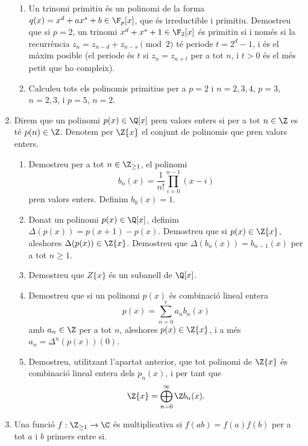 \begin{enumerate}[leftmargin=*]
\begin{enumerate}
\item Un trinomi primitiu és un polinomi de la forma $q(x)=x^d+ax^s+b\in
\F_p[x]$, que és irreductible i primitiu. Demostreu que si $p=2$, un
trinomi $x^d+x^s+1\in \F_2[x]$ és primitiu si i només si la
recurr\`{e}ncia $z_n=z_{n-d}+z_{n-s} \pmod{2}$ té periode $t=2^d-1$, i
és el màxim posible (el periode és $t$ si $z_{n}=z_{n+t}$ per a tot
$n$, i $t>0$ és el més petit que ho compleix).


\item Calculeu tots els polinomis primitius per a $p=2$ i $n=2,3,4$, $p=3$, $n=2,3$, i
$p=5$, $n=2$.

\end{enumerate}

\item Direm que un polinomi $p(x)\in \Q[x]$ pren valors
enters si per a tot $n\in \Z$ es té  $p(n)\in \Z$. Denotem per
$\Z\{x\}$ el conjunt de polinomis que pren valors enters.

\begin{enumerate}
\item Demostreu per a tot $n\in \Z_{\ge 1}$, el polinomi
$$b_n(x)=\frac1{n!} \prod_{i=0}^{n-1} (x-i)$$
pren valors enters. Definim $b_0(x)=1$.

\item Donat un polinomi $p(x)\in \Q[x]$, definim
$\Delta(p(x))=p(x+1)-p(x)$. Demostreu que si $p(x)\in \Z\{x\}$,
aleshores $\Delta(p(x))\in \Z\{x\}$. Demostreu que
$\Delta(b_n(x))=b_{n-1}(x)$ per a tot $n\ge 1$.

\item Demostreu que $Z\{x\}$ és un subanell de $\Q[x]$.

\item Demostreu que si un polinomi $p(x)$ és combinació lineal entera
$$p(x)=\sum_{n=0}^r a_n b_n(x)$$
amb $a_n\in \Z$ per a tot $n$, aleshores $p(x)\in \Z\{x\}$, i a més
$a_n=\Delta^{n}(p(x))(0)$.

\item Demostreu, utilitzant l'apartat anterior, que tot polinomi de
$\Z\{x\}$ és combinació lineal entera dels $p_n(x)$, i per tant que
$$\Z\{x\}=\bigoplus_{n=0}^{\infty} \Z b_n(x). $$


\end{enumerate}

\item Una funció $f:\Z_{\ge 1} \to \C$ és
multiplicativa si $f(a b)=f(a)  f(b)$ per a tot $a$ i $b$
primers entre si.

\begin{enumerate}


\end{enumerate}
\end{enumerate}
